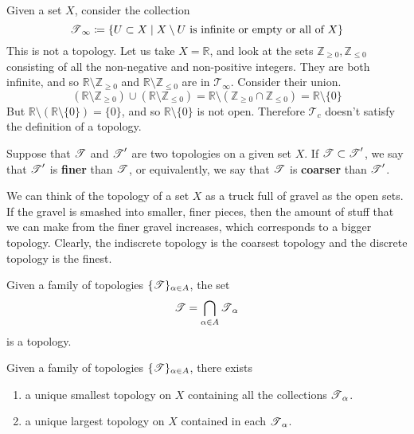   \begin{example}
    Given a set $X$, consider the collection 
    \begin{equation}
      \T_\infty \coloneqq \{U \subset X \mid X \setminus U \text{ is infinite or empty or all of }X \}
    \end{equation}
    This is not a topology. Let us take $X = \mathbb{R}$, and look at the sets $\mathbb{Z}_{\geq 0}, \mathbb{Z}_{\leq 0}$ consisting of all the non-negative and non-positive integers. They are both infinite, and so $\mathbb{R} \setminus \mathbb{Z}_{\geq 0}$ and $\mathbb{R} \setminus \mathbb{Z}_{\leq 0}$ are in $\mathcal{T}_\infty$. Consider their union. 
    \begin{equation}
      (\mathbb{R} \setminus \mathbb{Z}_{\geq 0}) \cup (\mathbb{R} \setminus \mathbb{Z}_{\leq 0}) = \mathbb{R} \setminus (\mathbb{Z}_{\geq 0} \cap \mathbb{Z}_{\leq 0}) = \mathbb{R} \setminus \{0\}
    \end{equation}
    But $\mathbb{R} \setminus (\mathbb{R} \setminus \{0\}) = \{0\}$, and so $\mathbb{R} \setminus \{0\}$ is not open. Therefore $\mathcal{T}_c$ doesn't satisfy the definition of a topology. 
  \end{example}


  \begin{definition}
    Suppose that $\T$ and $\T^\prime$ are two topologies on a given set $X$. If $\T \subset \T^\prime$, we say that $\T^\prime$ is \textbf{finer} than $\T$, or equivalently, we say that $\T$ is \textbf{coarser} than $\T^\prime$. 
  \end{definition}

  We can think of the topology of a set $X$ as a truck full of gravel as the open sets. If the gravel is smashed into smaller, finer pieces, then the amount of stuff that we can make from the finer gravel increases, which corresponds to a bigger topology. Clearly, the indiscrete topology is the coarsest topology and the discrete topology is the finest. 

  \begin{theorem}
    Given a family of topologies $\{\T\}_{\alpha \in A}$, the set 
    \begin{equation}
      \T = \bigcap_{\alpha \in A} \T_\alpha
    \end{equation}
    is a topology. 
  \end{theorem}

  \begin{corollary}
    Given a family of topologies $\{\T\}_{\alpha \in A}$, there exists 
    \begin{enumerate}
      \item a unique smallest topology on $X$ containing all the collections $\T_\alpha$. 
      \item a unique largest topology on $X$ contained in each $\T_\alpha$. 
    \end{enumerate}
  \end{corollary} 

